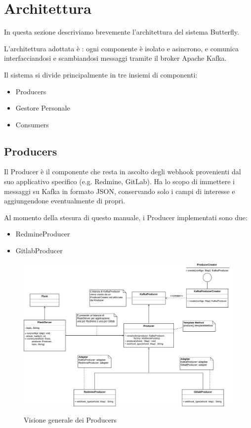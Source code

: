 \section{Architettura}

In questa sezione descriviamo brevemente l'architettura del sistema Butterfly.

L'architettura adottata è : ogni componente è isolato e asincrono,
e comunica interfacciandosi e scambiandosi messaggi tramite il broker Apache Kafka.

Il sistema si divide principalmente in tre insiemi di componenti:

\begin{itemize}
    \item Producers
    \item Gestore Personale
    \item Consumers
\end{itemize}

\subsection{Producers}
Il Producer è il componente che resta in ascolto degli webhook provenienti dal suo applicativo specifico (e.g. Redmine, GitLab).
Ha lo scopo di immettere i messaggi su Kafka in formato JSON, conservando solo i campi di interesse e aggiungendone eventualmente di propri.

Al momento della stesura di questo manuale, i Producer implementati sono due:
\begin{itemize}
    \item RedmineProducer
    \item GitlabProducer
\end{itemize}


\begin{figure}[H]
    \centering
    \includegraphics[width=\textwidth]{img/Producers.png}\\
    \caption{Visione generale dei Producers}
    \label{fig:producers}
\end{figure}

